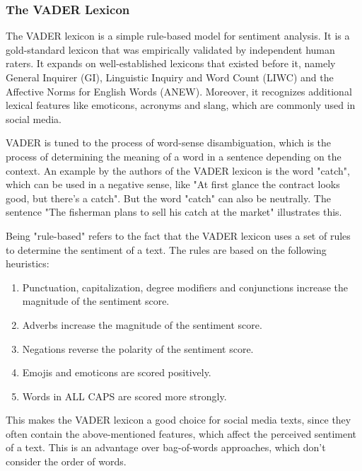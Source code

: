 \subsubsection*{The VADER Lexicon}

The VADER lexicon is a simple rule-based model for sentiment analysis. It is a gold-standard lexicon that was empirically validated by independent human raters. It expands on well-established lexicons that existed before it, namely General Inquirer (GI), Linguistic Inquiry and Word Count (LIWC) and the Affective Norms for English Words (ANEW). Moreover, it recognizes additional lexical features like emoticons, acronyms and slang, which are commonly used in social media.~\cite{hutto2014vader}

VADER is tuned to the process of word-sense disambiguation, which is the process of determining the meaning of a word in a sentence depending on the context. An example by the authors of the VADER lexicon is the word "catch", which can be used in a negative sense, like "At first glance the contract looks good, but there's a catch". But the word "catch" can also be neutrally. The sentence "The fisherman plans to sell his catch at the market" illustrates this.~\cite{hutto2014vader}

Being "rule-based" refers to the fact that the VADER lexicon uses a set of rules to determine the sentiment of a text. The rules are based on the following heuristics:

\begin{enumerate}
    \item Punctuation, capitalization, degree modifiers and conjunctions increase the magnitude of the sentiment score.
    \item Adverbs increase the magnitude of the sentiment score.
    \item Negations reverse the polarity of the sentiment score.
    \item Emojis and emoticons are scored positively.
    \item Words in ALL CAPS are scored more strongly.
\end{enumerate}

This makes the VADER lexicon a good choice for social media texts, since they often contain the above-mentioned features, which affect the perceived sentiment of a text. This is an advantage over bag-of-words approaches, which don't consider the order of words.

